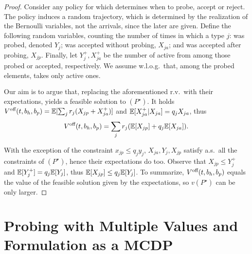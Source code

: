 \documentclass[letterpaper,11pt]{article}
\begin{document}
\begin{proof}
Consider any policy for \off which determines when to probe, accept or reject.
The policy induces a random trajectory, which is determined by the realization of the Bernoulli variables, not the arrivals, since the later are given.
Define the following random variables, counting the number of times in which a type $j$: was probed, denoted $Y_j$; was accepted without probing, $X_{ja}$; and was accepted after probing, $X_{jp}$.
Finally, let $Y_{j}^+,X_{ja}^+$ be the number of active from among those probed or accepted, respectively.
We assume w.l.o.g.\ that, among the probed elements, \off takes only active ones.

Our aim is to argue that, replacing the aforementioned r.v.\ with their expectations, yields a feasible solution to $(P^\star)$.
It holds $V^{\text{off}}(t,b_h,b_p) = \mathbb{E}[\sum_j r_j(X_{jp}+X_{ja}^+)]$ and $\mathbb{E}[X_{ja}^+|X_{ja}]=q_jX_{ja}$, thus
\[
V^{\text{off}}(t,b_h,b_p) = \sum_jr_j(\mathbb{E}[X_{jp}]+q_j\mathbb{E}[X_{ja}]).
\] 

With the exception of the constraint $x_{jp}\leq q_jy_j$, $X_{ja},Y_j,X_{jp}$ satisfy a.s.\ all the constraints of $(P^\star)$, hence their expectations do too.
Observe that $X_{jp}\leq Y_{j}^+$ and $\mathbb{E}[Y_j^+]=q_j\mathbb{E}[Y_j]$, thus $\mathbb{E}[X_{jp}]\leq q_j\mathbb{E}[Y_j]$.
To summarize, $V^{\text{off}}(t,b_h,b_p)$ equals the value of the feasible solution given by the expectations, so $v(P^\star)$ can be only larger.
\end{proof}

\section{Probing with Multiple Values and Formulation as a MCDP}
\end{document}
